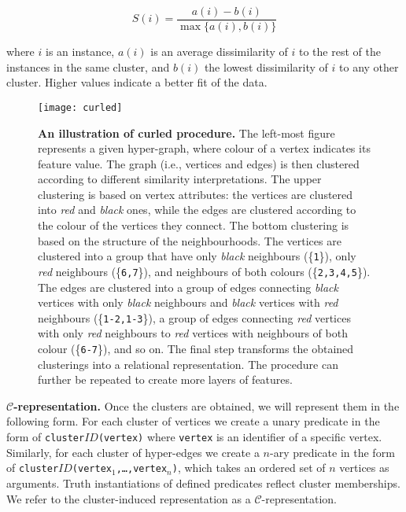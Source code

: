 \begin{equation}
    S(i) = \frac{a(i) - b(i)}{ \max \{ a(i), b(i)\}}
\end{equation}

where $i$ is an instance, $a(i)$ is an average dissimilarity of $i$ to the rest of the instances in the same cluster, and $b(i)$ the lowest dissimilarity of $i$ to any other cluster.
Higher values indicate a better fit of the data.


\begin{sidewaysfigure}
  \centering
  \medskip
  \texttt{[image: curled]}
  \caption[An illustration of \gls{curled} procedure]{\textbf{An illustration of \gls{curled} procedure.} The left-most figure represents a given hyper-graph, where colour of a vertex indicates its feature value. The graph (i.e., vertices and edges) is then clustered according to different similarity interpretations. The upper clustering is based on vertex attributes: the vertices are clustered into \textit{red} and \textit{black} ones, while the edges are clustered according to the colour of the vertices they connect. The bottom clustering is based on the structure of the neighbourhoods. The vertices are clustered into a group that have only \textit{black} neighbours (\{{\tt1}\}), only \textit{red} neighbours (\{\texttt{6,7}\}), and neighbours of both colours (\{\texttt{2,3,4,5}\}). The edges are clustered into a group of edges connecting \textit{black} vertices with only \textit{black} neighbours and \textit{black} vertices with \textit{red} neighbours (\{\texttt{1-2,1-3}\}), a group of edges connecting \textit{red} vertices with only \textit{red} neighbours to \textit{red} vertices with neighbours of both colour (\{\texttt{6-7}\}), and so on. The final step transforms the obtained clusterings into a relational representation. The procedure can further be repeated to create more layers of features. }
  \label{fig:curled}
\end{sidewaysfigure}


\textbf{$\mathcal{C}$-representation.}
Once the clusters are obtained, we will represent them in the following form.
For each cluster of vertices we create a unary predicate in the form of \texttt{cluster$ID$(vertex)} where \texttt{vertex} is an identifier of a specific vertex.
Similarly, for each cluster of hyper-edges we create a $n$-ary predicate in the form of \texttt{cluster$ID$(vertex$_1$,\ldots,vertex$_n$)}, which takes an ordered set of $n$ vertices as arguments.
Truth instantiations of defined predicates reflect cluster memberships.
We refer to the cluster-induced representation as a $\mathcal{C}$-representation.





